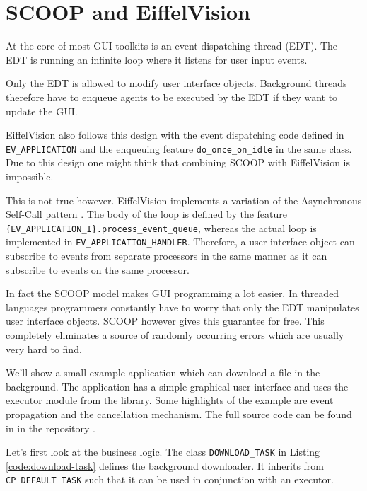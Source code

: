 \section{SCOOP and EiffelVision}

At the core of most GUI toolkits is an event dispatching thread (EDT).
The EDT is running an infinite loop where it listens for user input events.

Only the EDT is allowed to modify user interface objects.
Background threads therefore have to enqueue agents to be executed by the EDT if they want to update the GUI.

EiffelVision also follows this design with the event dispatching code defined in \lstinline!EV_APPLICATION! and the enqueuing feature \lstinline!do_once_on_idle! in the same class.
Due to this design one might think that combining SCOOP with EiffelVision is impossible.

This is not true however.
EiffelVision implements a variation of the Asynchronous Self-Call pattern .
The body of the loop is defined by the feature \lstinline!{EV_APPLICATION_I}.process_event_queue!, whereas the actual loop is implemented in \lstinline!EV_APPLICATION_HANDLER!.
Therefore, a user interface object can subscribe to events from separate processors in the same manner as it can subscribe to events on the same processor.

In fact the SCOOP model makes GUI programming a lot easier.
In threaded languages programmers constantly have to worry that only the EDT manipulates user interface objects.
SCOOP however gives this guarantee for free.
This completely eliminates a source of randomly occurring errors which are usually very hard to find.

We'll show a small example application which can download a file in the background.
The application has a simple graphical user interface and uses the executor module from the library.
Some highlights of the example are event propagation and the cancellation mechanism.
The full source code can be found in  in the repository \cite{web:repository}.

Let's first look at the business logic.
The class \lstinline!DOWNLOAD_TASK! in Listing \ref{code:download-task} defines the background downloader.
It inherits from \lstinline!CP_DEFAULT_TASK! such that it can be used in conjunction with an executor.


